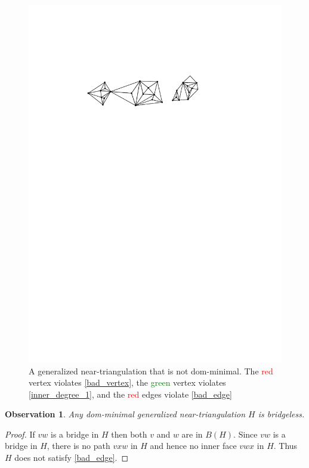 \documentclass{article}
\newtheorem{obs}{Observation}
\theoremstyle{definition}
\begin{document}
\begin{figure}[htbp]
  \centering
  \includegraphics[page=2]{figs/dom_minimal}
  \caption{A generalized near-triangulation that is not dom-minimal. The \textcolor{red}{red} vertex violates \cref{bad_vertex}, the \textcolor{green}{green} vertex violates \cref{inner_degree_1}, and the \textcolor{red}{red} edges violate \cref{bad_edge}}
  \label{dom_minimal_fig}
\end{figure}

\begin{obs}\label{bridgeless}
    Any dom-minimal generalized near-triangulation $H$ is bridgeless.
\end{obs}

\begin{proof}
   If $vw$ is a bridge in $H$ then both $v$ and $w$ are in $B(H)$.  Since $vw$ is a bridge in $H$, there is no path $vxw$ in $H$ and hence no inner face $vwx$ in $H$. Thus $H$ does not satisfy \cref{bad_edge}.
\end{proof}
\end{document}
